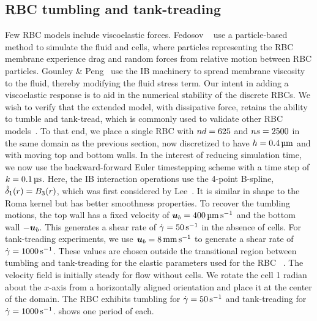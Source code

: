 \subsection{RBC tumbling and tank-treading}

Few RBC models include viscoelastic forces. Fedosov ~\cite{Fedosov:2010bc} use a particle-based
method to simulate the fluid and cells, where particles representing the RBC membrane experience drag and random
forces from relative motion between RBC particles. Gounley \& Peng~\cite{Gounley:2015ho} use the IB machinery to
spread membrane viscosity to the fluid, thereby modifying the fluid stress term. Our intent in adding a
viscoelastic response is to aid in the numerical stability of the discrete RBCs. We wish to verify that the
extended model, with dissipative force, retains the ability to tumble and tank-tread, which is commonly used to
validate other RBC models~\cite{Yazdani:2011cl, Omori:2012hw, Fai:2013do, Xu:2013kk}. To that end, we place a
single RBC with $\data\cardinality=625$ and $\sample\cardinality = 2500$ in the same domain as the previous
section, now discretized to have $h = 0.4\um$ and with moving top and bottom walls. In the interest of reducing
simulation time, we now use the backward-forward Euler timestepping scheme with a time step of $\timestep=0.1\us$.
Here, the IB interaction operations use the 4-point B-spline, $\hat{\delta}_1(r) = B_3(r)$, which was first considered by
Lee~\cite{Lee:2020tf}. It is similar in shape to the Roma kernel but has better smoothness properties. To recover
the tumbling motions, the top wall has a fixed velocity of $\u_b=400\umpersec$ and the bottom wall $-\boldsymbol{u}_b$. This
generates a shear rate of $\shear=50\persec$ in the absence of cells. For tank-treading experiments, we use
$\u_b=8\mmpersec$ to generate a shear rate of $\shear=1000\persec$. These values are chosen outside the
transitional region between tumbling and tank-treading for the elastic parameters used for the RBC~%
\cite{Kruger:2013ji}. The velocity field is initially steady for flow without cells. We rotate the cell 1 radian
about the $x$-axis from a horizontally aligned orientation and place it at the center of the domain. The RBC
exhibits tumbling for $\shear=50\persec$ and tank-treading for $\shear=1000\persec$.  shows
one period of each.

